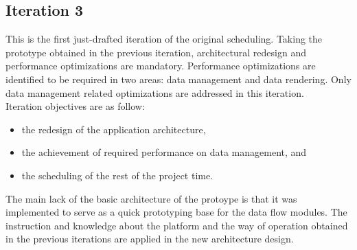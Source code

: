		\subsection{Iteration 3}

			This is the first just-drafted iteration of the original scheduling. Taking the prototype obtained in the previous iteration, architectural redesign and performance optimizations are mandatory. Performance optimizations are  identified to be required in two areas: data management and data rendering. Only data management related optimizations are addressed in this iteration.\\

			Iteration objectives are as follow:
			\begin{itemize} 
				\item the redesign of the application architecture, 
				\item the achievement of required performance on data management, and
				\item the scheduling of the rest of the project time.
			\end{itemize}

			The main lack of the basic architecture of the protoype is that it was implemented to serve as a quick prototyping base for the data flow modules. The instruction and knowledge about the platform and the way of operation obtained in the previous iterations are applied in the new architecture design.\\

